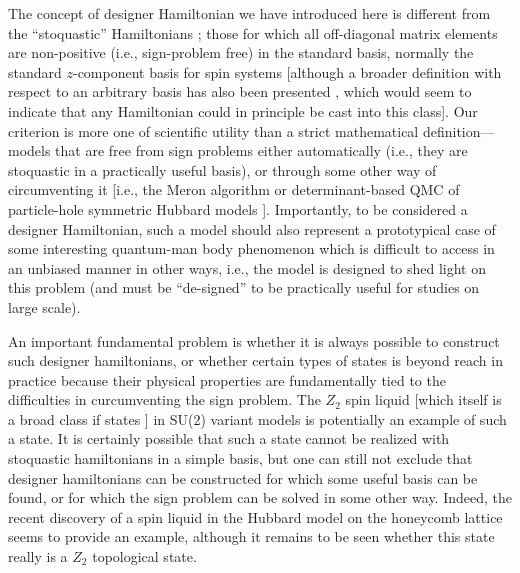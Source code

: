\documentclass[range]{ar2e}
\begin{document}
The concept of designer Hamiltonian we have introduced here is different from the ``stoquastic'' Hamiltonians \cite{Terhal08}; 
those for which all off-diagonal matrix elements are non-positive (i.e., sign-problem free) in the standard basis, normally the standard $z$-component 
basis for spin systems [although a broader definition with respect to an arbitrary basis has also been presented \cite{Terhal09}, which would seem to 
indicate that any Hamiltonian could in principle be cast into this class]. Our criterion is more one of scientific utility than a strict mathematical 
definition---models that are free from sign problems either automatically (i.e., they are stoquastic in a practically useful basis), or through some 
other way of circumventing it [i.e., the Meron algorithm \cite{Chandrasekharan99} or determinant-based QMC of particle-hole symmetric Hubbard 
models \cite{White89,Assaad05,Assaad07}]. Importantly, to be considered a designer Hamiltonian, such a model should also represent a prototypical case of 
some interesting quantum-man body phenomenon which is difficult to access in an unbiased manner in other ways, i.e., the model is designed to shed
light on this problem (and must be ``de-signed'' to be practically useful for studies on large scale).

An important fundamental problem is whether it is always possible to construct such designer hamiltonians, or whether certain types of 
states is beyond reach in practice because their physical properties are fundamentally tied to the difficulties in curcumventing the sign problem. 
The $Z_2$ spin liquid [which itself is a broad class if states \cite{Wen03}] in SU($2$) variant models is potentially an example of such a state. 
It is certainly possible that such a state cannot be realized with stoquastic hamiltonians in a simple basis, but one can still not exclude that 
designer hamiltonians can be constructed for which some useful basis can be found, or for which the sign problem can be solved in some other way.
Indeed, the recent discovery of a spin liquid in the Hubbard model on the honeycomb lattice \cite{Meng10} seems to provide an example, although it 
remains to be seen whether this state really is a $Z_2$ topological state.
\end{document}

